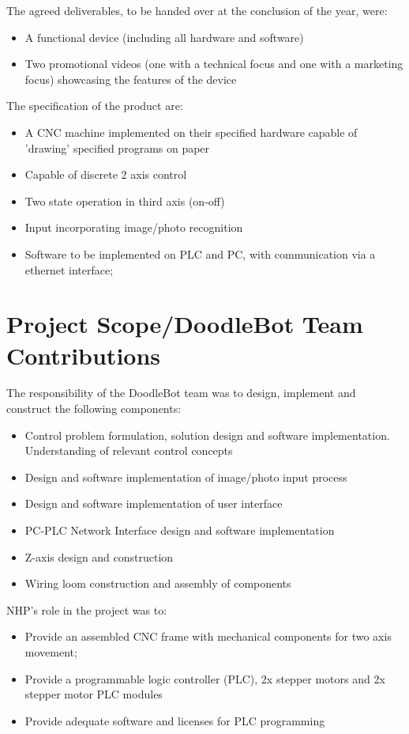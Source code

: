 The agreed deliverables, to be handed over at the conclusion of the year, were:
	\begin{itemize}
		\item A functional device (including all hardware and software)
		\item Two promotional videos (one with a technical focus and one with a marketing focus) showcasing the features of the device
	\end{itemize}	

The specification of the product are:
	\begin{itemize}
		\item A CNC machine implemented on their specified hardware capable of 'drawing' specified programs on paper
		\item Capable of discrete 2 axis control
		\item Two state operation in third axis (on-off)
		\item Input incorporating image/photo recognition
		\item Software to be implemented on PLC and PC, with communication via a ethernet interface;
	\end{itemize}

\section{Project Scope/DoodleBot Team Contributions}
The responsibility of the DoodleBot team was to design, implement and construct the following components:
	\begin{itemize}
		\item Control problem formulation, solution design and software implementation. Understanding of relevant control concepts
		\item Design and software implementation of image/photo input process
		\item Design and software implementation of user interface
		\item PC-PLC Network Interface design and software implementation
		\item Z-axis design and construction
		\item Wiring loom construction and assembly of components
	\end{itemize}
	
NHP's role in the project was to:
	\begin{itemize}
		\item Provide an assembled CNC frame with mechanical components for two axis movement;
		\item Provide a programmable logic controller (PLC), 2x stepper motors and 2x stepper motor PLC modules
		\item Provide adequate software and licenses for PLC programming
	\end{itemize}


